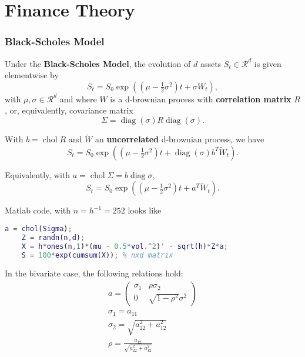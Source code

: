 \documentclass[10pt]{article}
\newcommand{\real}{\mathscr{R}}
\DeclareMathOperator{\diag}{diag}
\DeclareMathOperator{\chol}{chol}
\begin{document}
\part{Finance Theory}

\section{Black-Scholes Model}
\begin{outline}
  \1 Under the \textbf{Black-Scholes Model}, the evolution of $d$ assets $S_t\in\real^d$ is
  given elementwise by
  \begin{equation*}
    S_t = S_0\exp((\mu - \tfrac{1}{2}\sigma^2)t + \sigma W_t),
  \end{equation*}
  with $\mu,\sigma\in\real^d$ and where $W$ is a d-brownian process with \textbf{correlation
  matrix} $R$, or, equivalently, covariance matrix
  \begin{equation*}
    \Sigma=\diag(\sigma)R\diag(\sigma).
  \end{equation*}

  \1 With $b=\chol R$ and $\tilde W$ an \textbf{uncorrelated} d-brownian process, we have
  \begin{equation*}
    S_t = S_0\exp((\mu - \tfrac{1}{2}\sigma^2)t + \diag(\sigma)b^T\tilde W_t).
  \end{equation*}

  \1 Equivalently, with $a=\chol\Sigma = b\diag\sigma$,
  \begin{equation*}
    S_t = S_0\exp((\mu - \tfrac{1}{2}\sigma^2)t + a^T\tilde W_t).
  \end{equation*}

  \1 Matlab code, with $n=h^{-1}=252$ looks like
  \begin{lstlisting}[language=Matlab,basicstyle=\footnotesize,numberstyle=\tiny]
    a = chol(Sigma);
    Z = randn(n,d);
    X = h*ones(n,1)*(mu - 0.5*vol.^2)' - sqrt(h)*Z*a;
    S = 100*exp(cumsum(X)); % nxd matrix
  \end{lstlisting}

  \1 In the bivariate case, the following relations hold:
  \begin{gather*}
    a = \begin{pmatrix}\sigma_1 & \rho\sigma_2\\0&\sqrt{1-\rho^2}\sigma^2\end{pmatrix}\\
    \sigma_1 = a_{11}\\
    \sigma_2 = \sqrt{a_{22}^2 + a_{12}^2}\\
    \rho = \frac{a_{12}}{\sqrt{a_{22}^2 + a_{12}^2}}\\
  \end{gather*}
\end{outline}
\end{document}
